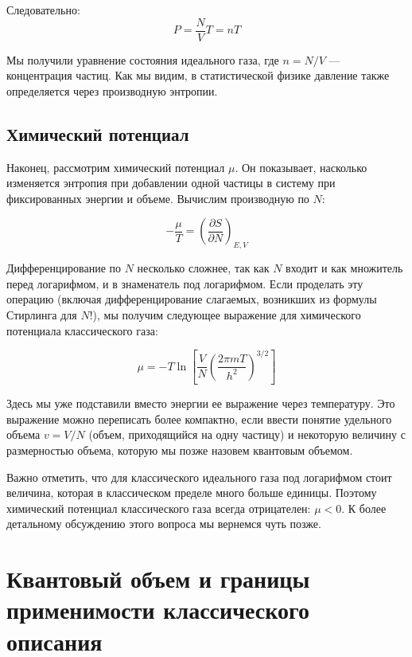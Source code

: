 \documentclass[../general/general]{subfiles}
\begin{document}
Следовательно:
\begin{equation}
P = \frac{N}{V} T = nT
\end{equation}

Мы получили уравнение состояния идеального газа, где $n = N/V$ — концентрация частиц. Как мы видим, в статистической физике давление также определяется через производную энтропии.

\subsection{Химический потенциал}

Наконец, рассмотрим химический потенциал $\mu$. Он показывает, насколько изменяется энтропия при добавлении одной частицы в систему при фиксированных энергии и объеме. Вычислим производную по $N$:

\begin{equation}
-\frac{\mu}{T} = \left( \frac{\partial S}{\partial N} \right)_{E, V}
\end{equation}

Дифференцирование по $N$ несколько сложнее, так как $N$ входит и как множитель перед логарифмом, и в знаменатель под логарифмом. Если проделать эту операцию (включая дифференцирование слагаемых, возникших из формулы Стирлинга для $N!$), мы получим следующее выражение для химического потенциала классического газа:

\begin{equation}
\mu = -T \ln \left[ \frac{V}{N} \left( \frac{2\pi m T}{h^2} \right)^{3/2} \right]
\end{equation}

Здесь мы уже подставили вместо энергии ее выражение через температуру. Это выражение можно переписать более компактно, если ввести понятие удельного объема $v = V/N$ (объем, приходящийся на одну частицу) и некоторую величину с размерностью объема, которую мы позже назовем квантовым объемом.

Важно отметить, что для классического идеального газа под логарифмом стоит величина, которая в классическом пределе много больше единицы. Поэтому химический потенциал классического газа всегда отрицателен: $\mu < 0$. К более детальному обсуждению этого вопроса мы вернемся чуть позже.


\section{Квантовый объем и границы применимости классического описания}
\end{document}
